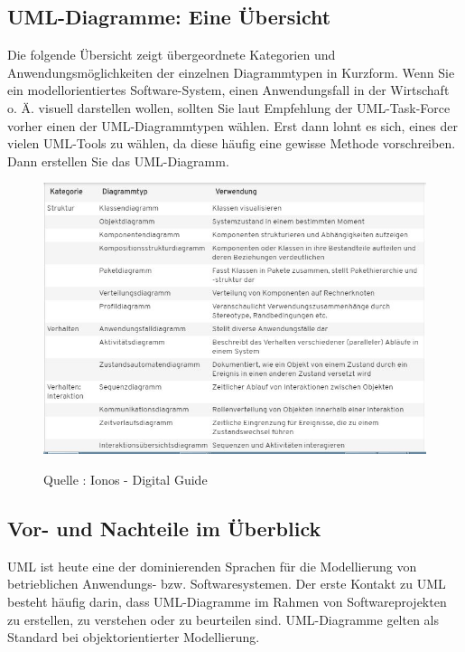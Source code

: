 \subsection{UML-Diagramme: Eine Übersicht}
Die folgende Übersicht zeigt übergeordnete Kategorien und Anwendungsmöglichkeiten der einzelnen Diagrammtypen in Kurzform. Wenn Sie ein modellorientiertes Software-System, einen Anwendungsfall in der Wirtschaft o. Ä. visuell darstellen wollen, sollten Sie laut Empfehlung der UML-Task-Force vorher einen der UML-Diagrammtypen wählen. Erst dann lohnt es sich, eines der vielen UML-Tools zu wählen, da diese häufig eine gewisse Methode vorschreiben. Dann erstellen Sie das UML-Diagramm.\\
\begin{center}
\begin{figure}[h]
   

\includegraphics[scale=0.8]{Graphics/UMLdiagramme.jpg} 

 Quelle : Ionos - Digital Guide 
 
\label{fig5}


\end{figure}
\end{center}
\newpage
\subsection{Vor- und Nachteile im Überblick}
UML ist heute eine der dominierenden Sprachen für die Modellierung von betrieblichen Anwendungs- bzw. Softwaresystemen. Der erste Kontakt zu UML besteht häufig darin, dass UML-Diagramme im Rahmen von Softwareprojekten zu erstellen, zu verstehen oder zu beurteilen sind. UML-Diagramme gelten als Standard bei objektorientierter Modellierung.\\


